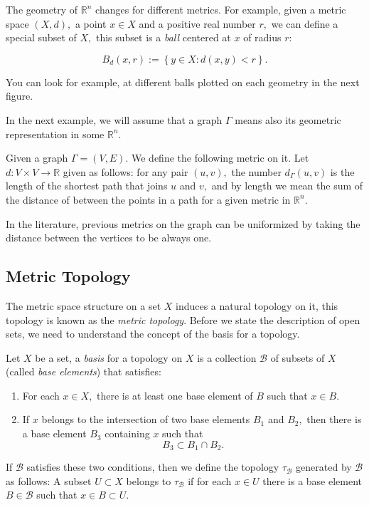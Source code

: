 \documentclass[
	fontsize=10pt, %
	twoside=false, %
	secnumdepth=1, %
]{kaobook}
\begin{document}
The geometry of $\mathbb{R}^n$ changes for different metrics. For example, given a metric space $(X,d),$ a point $x\in X$ and a positive real number $r,$ we can define a special subset of $X,$ this subset is a \emph{ball} centered at $x$ of radius $r$:

$$B_d(x,r):=\left\{y\in X: d(x,y)< r \right\}.$$

You can look for example, at different balls plotted on each geometry in the next figure.

In the next example, we will assume that a graph $\Gamma$ means also its geometric representation in some $\mathbb{R}^n.$

\begin{example}
Given a graph $\Gamma=(V,E).$ We define the following metric on it. Let $d: V\times V \to \mathbb{R}$ given as follows: for any pair $(u,v),$ the number $d_\Gamma (u,v)$ is the length of the shortest path that joins $u$ and $v,$ and by length we mean the sum of the distance of between the points in a path for a given metric in $\mathbb{R}^n.$
\end{example}

In the literature, previous metrics on the graph can be uniformized by taking the distance between the vertices to be always one. 
\subsection{Metric Topology}

The metric space structure on a set $X$ induces a natural topology on it, this topology is known as the \emph{metric topology}. Before we state the description of open sets, we need to understand the concept of the basis for a topology.

\begin{definition}
Let $X$ be a set, a \emph{basis} for a topology on $X$ is a collection $\mathcal{B}$ of subsets of $X$ (called \emph{base elements}) that satisfies:
\begin{enumerate}
\item For each $x\in X,$ there is at least one base element of $B$ such that $x\in B.$
\item If $x$ belongs to the intersection of two base elements $B_1$ and $B_2,$ then there is a base element $B_3$ containing $x$ such that $$B_3\subset B_1\cap B_2.$$
\end{enumerate}

If $\mathcal{B}$ satisfies these two conditions, then we define the topology $\tau_{\mathcal{B}}$ generated by $\mathcal{B}$ as follows: A subset $U\subset X$ belongs to $\tau_{\mathcal{B}}$ if for each $x\in U$ there is a base element $B\in\mathcal{B}$ such that $x\in B\subset U.$
\end{definition}
\end{document}
